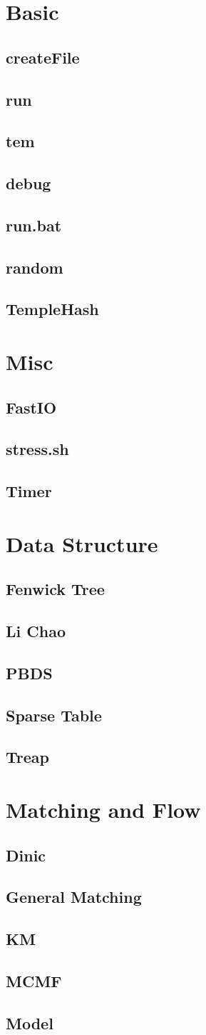 \documentclass[a4paper,10pt,twocolumn,oneside]{article}
\begin{document}
\pagestyle{fancy}
\fancyfoot{}
\fancyhead[R]{\thepage}
\renewcommand{\headrulewidth}{0.4pt}
\renewcommand{\contentsname}{Contents} 

\scriptsize
\vspace{-2em}
\tableofcontents
\vspace{-1em}



\newcommand{\includecode}[2]{
  \subsection{#1}
  \vspace{-0.8em}
  
  \vspace{-1.2em}
}

\newcommand{\includetex}[2]{
  \subsection{#1}
  
  \vspace{-1.2em}
}

\newcommand{\sectiontitle}[1]{
  \section{#1}
  \vspace{-0.5em}
}



\sectiontitle{Basic}
\includecode{createFile}{../code/Basic/createFile}
\includecode{run}{../code/Basic/run}
\includecode{tem}{../code/Basic/tem.cpp}
\includecode{debug}{../code/Basic/debug.cpp}
\includecode{run.bat}{../code/Basic/run.bat}
\includecode{random}{../code/Basic/random.cpp}
\includecode{TempleHash}{../code/Basic/TempleHash.sh}

\sectiontitle{Misc}
\includecode{FastIO}{../code/Misc/FastIO.cpp}
\includecode{stress.sh}{../code/Misc/stress.sh}
\includecode{Timer}{../code/Misc/Timer.cpp}

\sectiontitle{Data Structure}
\includecode{Fenwick Tree}{../code/DataStructure/FenwickTree.cpp}
\includecode{Li Chao}{../code/DataStructure/LiChao.cpp}
\includecode{PBDS}{../code/DataStructure/PBDS.cpp}
\includecode{Sparse Table}{../code/DataStructure/SparseTable.cpp}
\includecode{Treap}{../code/DataStructure/Treap.cpp}

\sectiontitle{Matching and Flow}
\includecode{Dinic}{../code/Flow/Dinic.cpp}
\includecode{General Matching}{../code/Flow/GeneralMatching.cpp}
\includecode{KM}{../code/Flow/KM.cpp}
\includecode{MCMF}{../code/Flow/MCMF.cpp}
\includetex{Model}{../code/Flow/Model.tex}
\end{document}
